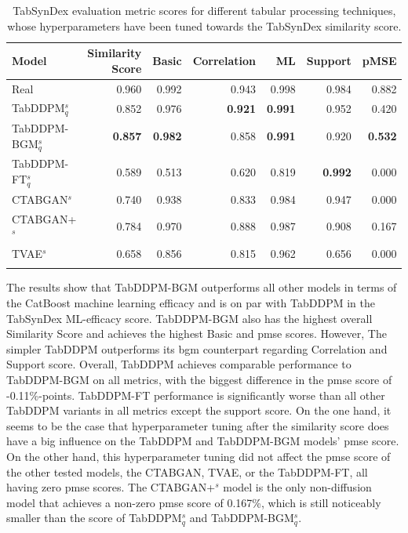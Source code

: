 \begin{table}[h]
	\centering
	\begin{tabular}{lrrrrrr}
		\toprule
		\textbf{Model}        & \textbf{Similarity Score} & \textbf{Basic} & \textbf{Correlation} & \textbf{ML}    & \textbf{Support} & \textbf{pMSE}  \\
		\midrule
		Real                  & 0.960                     & 0.992          & 0.943                & 0.998          & 0.984            & 0.882          \\
		TabDDPM$^{s}_{q}$     & 0.852                     & 0.976          & \textbf{0.921}       & \textbf{0.991} & 0.952            & 0.420          \\
		TabDDPM-BGM$^{s}_{q}$ & \textbf{0.857}            & \textbf{0.982} & 0.858                & \textbf{0.991} & 0.920            & \textbf{0.532} \\
		TabDDPM-FT$^{s}_{q}$  & 0.589                     & 0.513          & 0.620                & 0.819          & \textbf{0.992}   & 0.000          \\
		CTABGAN$^{s}$         & 0.740                     & 0.938          & 0.833                & 0.984          & 0.947            & 0.000          \\
		CTABGAN+$^{s}$        & 0.784                     & 0.970          & 0.888                & 0.987          & 0.908            & 0.167          \\
		TVAE$^{s}$            & 0.658                     & 0.856          & 0.815                & 0.962          & 0.656            & 0.000          \\
		\bottomrule
		\multicolumn{7}{c}{}\\[-0.6em]
	\end{tabular}
	\caption[Experiment 2 TabSynDex]{TabSynDex evaluation metric scores for different tabular processing techniques, whose hyperparameters have been tuned towards the TabSynDex similarity score.}
	\label{tab:exp2-sim}
\end{table}

The results show that TabDDPM-BGM outperforms all other models in terms of the CatBoost machine learning efficacy and is on par with TabDDPM in the TabSynDex ML-efficacy score.
TabDDPM-BGM also has the highest overall Similarity Score and achieves the highest Basic and \gls{pmse} scores.
However, The simpler TabDDPM outperforms its \gls{bgm} counterpart regarding Correlation and Support score.
Overall, TabDDPM achieves comparable performance to TabDDPM-BGM on all metrics, with the biggest difference in the \gls{pmse} score of -0.11\%-points.
TabDDPM-FT performance is significantly worse than all other TabDDPM variants in all metrics except the support score.
On the one hand, it seems to be the case that hyperparameter tuning after the similarity score does have a big influence on the TabDDPM and TabDDPM-BGM models' \gls{pmse} score.
On the other hand, this hyperparameter tuning did not affect the \gls{pmse} score of the other tested models, the CTABGAN, TVAE, or the TabDDPM-FT, all having zero \gls{pmse} scores.
The CTABGAN+$^{s}$ model is the only non-diffusion model that achieves a non-zero \gls{pmse} score of 0.167\%, which is still noticeably smaller than the score of TabDDPM$^{s}_{q}$ and TabDDPM-BGM$^{s}_{q}$.
\newpage
